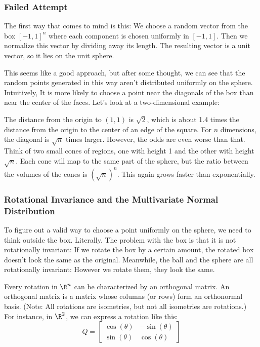 \documentclass{article}
\begin{document}
\subsubsection{Failed Attempt}

The first way that comes to mind is this: We choose a random vector from the box $[-1, 1]^n$ where each component is chosen uniformly in $[-1, 1]$. Then we normalize this vector by dividing away its length. The resulting vector is a unit vector, so it lies on the unit sphere.

This seems like a good approach, but after some thought, we can see that the random points generated in this way aren't distributed uniformly on the sphere. Intuitively, It is more likely to choose a point near the diagonals of the box than near the center of the faces. Let's look at a two-dimensional example:


The distance from the origin to $(1, 1)$ is $\sqrt{2}$, which is about 1.4 times the distance from the origin to the center of an edge of the square. For $n$ dimensions, the diagonal is $\sqrt{n}$ times larger. However, the odds are even worse than that. Think of two small cones of regions, one with height 1 and the other with height $\sqrt{n}$. Each cone will map to the same part of the sphere, but the ratio between the volumes of the cones is $(\sqrt{n})^n$. This again grows faster than exponentially.

\subsubsection{Rotational Invariance and the Multivariate Normal Distribution}

To figure out a valid way to choose a point uniformly on the sphere, we need to think outside the box. Literally. The problem with the box is that it is not rotationally invariant: If we rotate the box by a certain amount, the rotated box doesn't look the same as the original. Meanwhile, the ball and the sphere are all rotationally invariant: However we rotate them, they look the same.

Every rotation in $\R^n$ can be characterized by an orthogonal matrix. An orthogonal matrix is a matrix whose columns (or rows) form an orthonormal basis. (Note: All rotations are isometries, but not all isometries are rotations.) For instance, in $\R^2$, we can express a rotation like this:
\[
  Q = \begin{bmatrix}
    \cos(\theta) & -\sin(\theta) \\
    \sin(\theta) & \cos(\theta)
  \end{bmatrix}
\]
\end{document}
